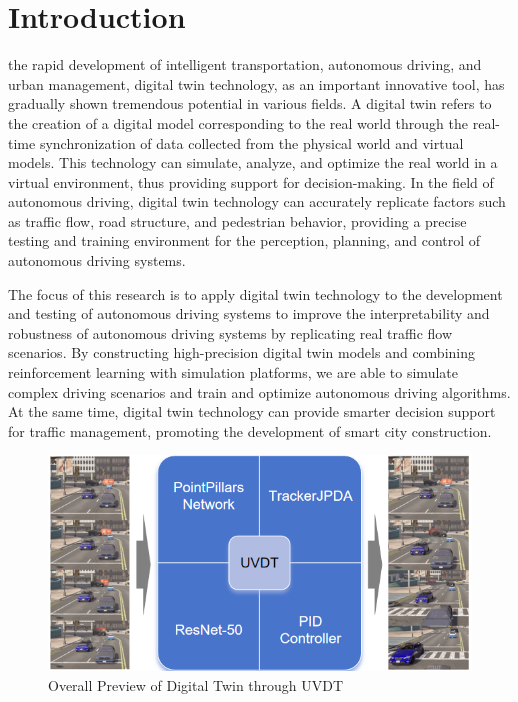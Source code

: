 \documentclass[lettersize,journal]{IEEEtran}
\begin{document}
\section{Introduction}

 the rapid development of intelligent transportation, autonomous driving, and urban management, digital twin technology, as an important innovative tool, has gradually shown tremendous potential in various fields\cite{Alpher17}. 
A digital twin refers to the creation of a digital model corresponding to the real world through the real-time synchronization of data collected from the physical world and virtual models\cite{Alpher20c}. 
This technology can simulate, analyze, and optimize the real world in a virtual environment, thus providing support for decision-making\cite{Alpher21b}. 
In the field of autonomous driving, digital twin technology can accurately replicate factors such as traffic flow, road structure, and pedestrian behavior, providing a precise testing and training environment for the perception, planning, and control of autonomous driving systems\cite{Alpher24}\cite{Alpher20d}.

The focus of this research is to apply digital twin technology to the development and testing of autonomous driving systems to improve the interpretability and robustness of autonomous driving systems by replicating real traffic flow scenarios\cite{Alpher24b}.
By constructing high-precision digital twin models and combining reinforcement learning with simulation platforms, we are able to simulate complex driving scenarios and train and optimize autonomous driving algorithms\cite{Alpher22c}. 
At the same time, digital twin technology can provide smarter decision support for traffic management, promoting the development of smart city construction\cite{Alpher17b}.

\begin{figure}[t]
	\centering
	\includegraphics[width=\linewidth]{picture/picture1.png} 
	\caption{Overall Preview of Digital Twin through UVDT} 
	\label{fig:example} 
\end{figure}
\end{document}
